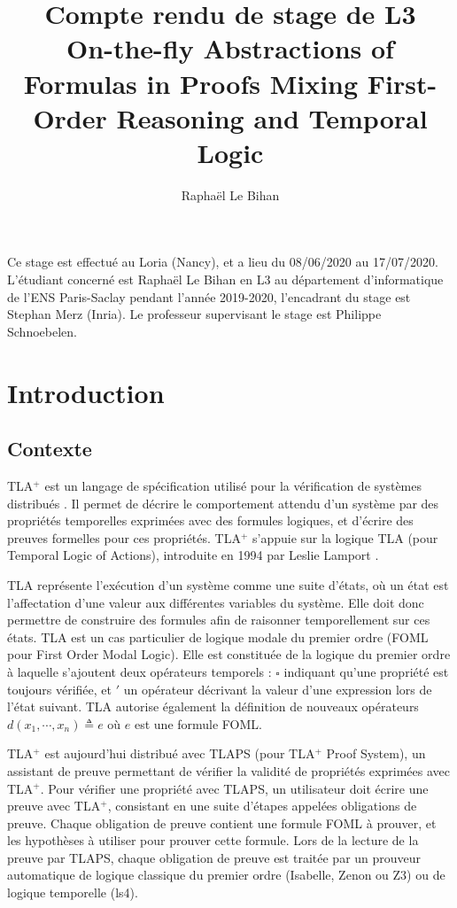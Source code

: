 \documentclass[12pt]{article}
\title{%
  Compte rendu de stage de L3\\
  \vspace{8pt}
  \large On-the-fly Abstractions of Formulas in Proofs
Mixing First-Order Reasoning and Temporal Logic}
\author{Raphaël Le Bihan}
\begin{document}
\fancyfoot[CEO]{\thepage}

\maketitle

Ce stage est effectué au Loria (Nancy), et a lieu du 08/06/2020 au 17/07/2020.
L'étudiant concerné est Raphaël Le Bihan en L3 au département d'informatique de l'ENS Paris-Saclay pendant l'année 2019-2020, l'encadrant du stage est Stephan Merz (Inria).
Le professeur supervisant le stage est Philippe Schnoebelen.


\clearpage

\section{Introduction}

\subsection{Contexte}

TLA$^+$ est un langage de spécification utilisé pour la vérification de systèmes distribués \cite{lamport2002}.
Il permet de décrire le comportement attendu d'un système par des propriétés temporelles exprimées avec des formules logiques, et d'écrire des preuves formelles pour ces propriétés.
TLA$^+$ s'appuie sur la logique TLA (pour Temporal Logic of Actions), introduite en 1994 par Leslie Lamport \cite{lamport1994}.

TLA représente l'exécution d'un système comme une suite d'états, où un état est l'affectation d'une valeur aux différentes variables du système.
Elle doit donc permettre de construire des formules afin de raisonner temporellement sur ces états.
TLA est un cas particulier de logique modale du premier ordre (FOML pour First Order Modal Logic).
Elle est constituée de la logique du premier ordre à laquelle s'ajoutent deux opérateurs temporels : $\square$ indiquant qu'une propriété est toujours vérifiée, et $'$ un opérateur décrivant la valeur d'une expression lors de l'état suivant.
TLA autorise également la définition de nouveaux opérateurs $d(x_1, \cdots, x_n) \triangleq e$ où $e$ est une formule FOML.

TLA$^+$ est aujourd'hui distribué avec TLAPS \cite{TLAPSurl} (pour TLA$^+$ Proof System), un assistant de preuve permettant de vérifier la validité de propriétés exprimées avec TLA$^+$.
Pour vérifier une propriété avec TLAPS, un utilisateur doit écrire une preuve avec TLA$^+$, consistant en une suite d'étapes appelées obligations de preuve.
Chaque obligation de preuve contient une formule FOML à prouver, et les hypothèses à utiliser pour prouver cette formule.
Lors de la lecture de la preuve par TLAPS, chaque obligation de preuve est traitée par un prouveur automatique de logique classique du premier ordre (Isabelle, Zenon ou Z3) ou de logique temporelle (ls4).
\end{document}

